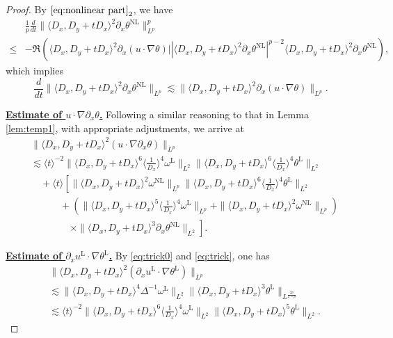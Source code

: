 \documentclass[reqno, 12pt]{amsart} %
\theoremstyle{plain} %
\theoremstyle{definition}
\theoremstyle{remark}
\numberwithin{equation}{section} %
\newcommand{\lt}{\left}
\newcommand{\rt}{\right}
\newcommand{\px}{\partial_x}
\begin{document}
	\begin{proof}
		By $\eqref{eq:nonlinear part}_2$, we have
		$$
		\begin{aligned}
			& \frac1p \frac{d}{ d t}\|\langle D_x, D_y+t D_x\rangle^2 \px \theta^{\mathrm{NL}}\|_{L^p}^p \\
			\leq & -\Re\lt(\langle D_x, D_y+t D_x\rangle^2 \px \lt(u \cdot \nabla \theta\rt)   \Big| \lt|\langle D_x, D_y+t D_x\rangle^2  \px \theta^{\mathrm{NL}}\rt|^{p-2}\langle D_x, D_y+t D_x\rangle^2 \px \theta^{\mathrm{NL}}\right),
		\end{aligned}
		$$
		which implies
		$$
		\frac{d}{d t}\|\langle D_x, D_y+t D_x\rangle^2 \px \theta^{\mathrm{NL}}\|_{L^p} \lesssim \|\langle D_x, D_y+t D_x\rangle^2 \px (u \cdot \nabla \theta)\|_{L^p}.
		$$
		
		\underline{\bf Estimate of $u \cdot \nabla \px \theta$.} Following a similar reasoning to that in Lemma \ref{lem:temp1}, with appropriate adjustments, we arrive at
		$$
		\begin{aligned}
			& \|\langle D_x, D_y+t D_x\rangle^2\left(u  \cdot \nabla \px \theta \right)\|_{L^p} \\
			&\lesssim   \langle t\rangle^{-2}  \|\langle D_x, D_y+t D_x\rangle^6 \langle\frac{1}{D_x}\rangle^4 \omega^{\mathrm{L}}\|_{L^2}  \|\langle D_x, D_y+t D_x\rangle^6 \langle\frac{1}{D_x}\rangle^4  \theta^{\mathrm{L}}\|_{L^2} \\
			& \quad+\langle t\rangle\left[ \|\langle D_x, D_y+t D_x\rangle^2 \omega^{\mathrm{NL}}\|_{L^p}\|\langle D_x, D_y+t D_x\rangle^6 \langle\frac{1}{D_x}\rangle^4  \theta^{\mathrm{L}}\|_{L^2}\right. \\
			& \left.\qquad \quad+(\|\langle D_x, D_y+t D_x\rangle^5 \langle\frac{1}{D_x}\rangle^4 \omega^{\mathrm{L}}\|_{L^p}+\|\langle D_x, D_y+t D_x\rangle^2 \omega^{\mathrm{NL}}\|_{L^p})\rt. \\
			&\lt. \qquad \qquad\times \|\langle D_x, D_y+t D_x\rangle^3\px \theta^{\mathrm{NL}}\|_{L^2} \right].
		\end{aligned}
		$$
		
		\underline{\bf Estimate of $ \px u^{\mathrm{L}} \cdot \nabla \theta^{\mathrm{L}}$.}
		By \eqref{eq:trick0} and \eqref{eq:trick}, one has
		$$
		\begin{aligned}
			& \|\langle D_x, D_y+t D_x\rangle^2\left( \px u^{\mathrm{L}} \cdot \nabla  \theta^{\mathrm{L}}\right)\|_{L^p} \\
			&\lesssim  \|\langle D_x, D_y+t D_x\rangle^4 \Delta^{-1} \omega^{\mathrm{L}}\|_{L^2}\|\langle D_x, D_y+t D_x\rangle^3  \theta^{\mathrm{L}}\|_{L^{\frac{2 p}{2-p}}} \\
			&\lesssim  \langle t\rangle^{-2}\|\langle D_x, D_y+t D_x\rangle^6 \langle\frac{1}{D_x}\rangle^4 \omega^{\mathrm{L}}\|_{L^2}\|\langle D_x, D_y+t D_x\rangle^5  \theta^{\mathrm{L}}\|_{L^2}.
		\end{aligned}
		$$
		

\end{proof}
\end{document}
